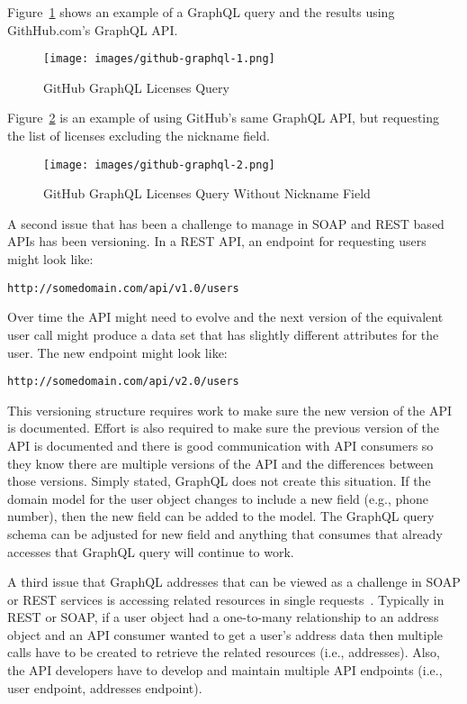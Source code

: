Figure~\ref{f:github-graphql-1} shows an example of a GraphQL query and the
results using GithHub.com's GraphQL API.  
\begin{figure}[!ht]
  \centering\texttt{[image: images/github-graphql-1.png]}
  \caption{GitHub GraphQL Licenses Query}\label{f:github-graphql-1}
\end{figure}
Figure~\ref{f:github-graphql-2} is an
example of using GitHub's same GraphQL API, but requesting the list of licenses
excluding the nickname field.
\begin{figure}[!ht]
  \centering\texttt{[image: images/github-graphql-2.png]}
  \caption{GitHub GraphQL Licenses Query Without Nickname Field}\label{f:github-graphql-2}
\end{figure}

A second issue that has been a challenge to manage in SOAP and REST based APIs
has been versioning.  In a REST API, an endpoint for requesting users might look
like:
\begin{verbatim}http://somedomain.com/api/v1.0/users \end{verbatim}
Over time the API might need to evolve and the next version of the equivalent
user call might produce a data set that has slightly different attributes for
the user. The new endpoint might look like:
\begin{verbatim}http://somedomain.com/api/v2.0/users \end{verbatim}
This versioning structure requires work to make sure the new version of the API
is documented.  Effort is also required to make sure the previous version of the
API is documented and there is good communication with API consumers so they
know there are multiple versions of the API and the differences between those
versions.  Simply stated, GraphQL does not create this situation.  If the domain
model for the user object changes to include a new field (e.g., phone number),
then the new field can be added to the model.  The GraphQL query schema can be
adjusted for new field and anything that consumes that already accesses that 
GraphQL query will continue to work.

A third issue that GraphQL addresses that can be viewed as a challenge in SOAP 
or REST services is accessing related resources in single requests~\cite{hid505FacebookGraphQL2018}.  
Typically in REST or SOAP, if a user object had a one-to-many relationship to 
an address object and an API consumer wanted to get a user's address data then 
multiple calls have to be created to retrieve the related resources 
(i.e., addresses).  Also, the API developers have to develop and maintain 
multiple API endpoints (i.e., user endpoint, addresses endpoint).

